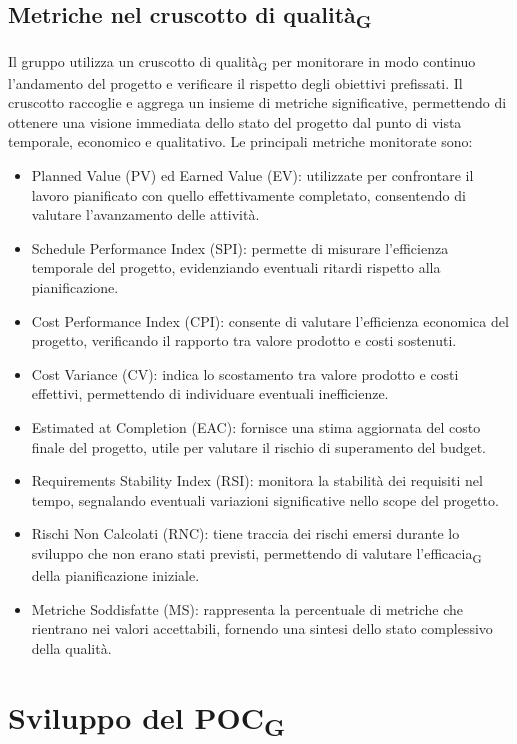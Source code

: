 \documentclass[11pt,a4paper]{article}
\newcommand{\gls}[1]{#1\textsubscript{G}}
\begin{document}
\subsection{Metriche nel \gls{cruscotto di qualità}}
Il gruppo utilizza un \gls{cruscotto di qualità} per monitorare in modo continuo l’andamento del progetto e verificare il rispetto degli obiettivi prefissati.
Il cruscotto raccoglie e aggrega un insieme di metriche significative, permettendo di ottenere una visione immediata dello stato del progetto dal punto di vista temporale, economico e qualitativo.
Le principali metriche monitorate sono:
\begin{itemize}
    \item Planned Value (PV) ed Earned Value (EV): utilizzate per confrontare il lavoro pianificato con quello effettivamente completato, consentendo di valutare l’avanzamento delle attività.
    \item Schedule Performance Index (SPI): permette di misurare l’efficienza temporale del progetto, evidenziando eventuali ritardi rispetto alla pianificazione.
    \item Cost Performance Index (CPI): consente di valutare l’efficienza economica del progetto, verificando il rapporto tra valore prodotto e costi sostenuti.
    \item Cost Variance (CV): indica lo scostamento tra valore prodotto e costi effettivi, permettendo di individuare eventuali inefficienze.
    \item Estimated at Completion (EAC): fornisce una stima aggiornata del costo finale del progetto, utile per valutare il rischio di superamento del budget.
    \item Requirements Stability Index (RSI): monitora la stabilità dei requisiti nel tempo, segnalando eventuali variazioni significative nello scope del progetto.
    \item Rischi Non Calcolati (RNC): tiene traccia dei rischi emersi durante lo sviluppo che non erano stati previsti, permettendo di valutare l’\gls{efficacia} della pianificazione iniziale.
    \item Metriche Soddisfatte (MS): rappresenta la percentuale di metriche che rientrano nei valori accettabili, fornendo una sintesi dello stato complessivo della qualità.
\end{itemize}

\newpage
 
\section{Sviluppo del \gls{POC}}
 
\end{document}
